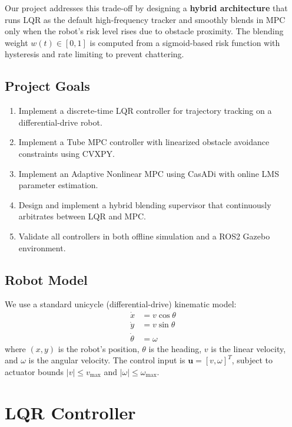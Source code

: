 \documentclass[12pt, a4paper]{article}
\begin{document}
Our project addresses this trade-off by designing a \textbf{hybrid architecture} that runs LQR as the default high-frequency tracker and smoothly blends in MPC only when the robot's risk level rises due to obstacle proximity. The blending weight $w(t) \in [0,1]$ is computed from a sigmoid-based risk function with hysteresis and rate limiting to prevent chattering.

\subsection{Project Goals}
\begin{enumerate}
    \item Implement a discrete-time LQR controller for trajectory tracking on a differential-drive robot.
    \item Implement a Tube MPC controller with linearized obstacle avoidance constraints using CVXPY.
    \item Implement an Adaptive Nonlinear MPC using CasADi with online LMS parameter estimation.
    \item Design and implement a hybrid blending supervisor that continuously arbitrates between LQR and MPC.
    \item Validate all controllers in both offline simulation and a ROS2 Gazebo environment.
\end{enumerate}

\subsection{Robot Model}
We use a standard unicycle (differential-drive) kinematic model:
\begin{align}
    \dot{x} &= v \cos\theta \label{eq:dyn_x}\\
    \dot{y} &= v \sin\theta \label{eq:dyn_y}\\
    \dot{\theta} &= \omega \label{eq:dyn_theta}
\end{align}
where $(x, y)$ is the robot's position, $\theta$ is the heading, $v$ is the linear velocity, and $\omega$ is the angular velocity. The control input is $\mathbf{u} = [v, \omega]^T$, subject to actuator bounds $|v| \leq v_{\max}$ and $|\omega| \leq \omega_{\max}$.


\section{LQR Controller}
\end{document}
